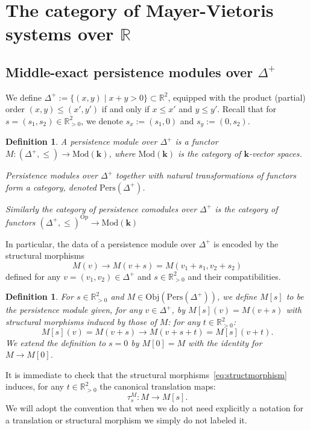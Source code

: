 \documentclass[a4paper, english, 11pt]{article}
\newcommand{\kk}[0]{\textbf{k}}
\newcommand{\Mod}[0]{\text{Mod}}
\newcommand{\0}{\vec{0}}
\newcommand{\R}[0]{\mathbb{R}}
\newcommand{\Obj}[0]{\text{Obj}}
\newcommand{\Op}[0]{\text{Op}}
\newcommand{\Pers}[0]{\text{Pers}}
\newtheorem{defi}[prop]{Definition}
\begin{document}
\section{The category of Mayer-Vietoris systems over $\R$}
\subsection{Middle-exact persistence modules over $\Delta^+$}

We define $\Delta^+ := \{(x,y)\mid x+y > 0\}\subset \R^2$, equipped with the product (partial) order $(x,y)\leq (x',y')$ if and only if $x\leq x'$ and $y\leq y' $. Recall that for $s=(s_1,s_2)\in \R^2_{>0}$, we denote $s_x:=(s_1,0)$ and $s_y := (0,s_2)$. 

\begin{defi}\label{D:PerModule}
A persistence module over $\Delta^+$ is a functor $M : (\Delta^+,\leq) \longrightarrow \Mod(\kk)$, where $\Mod(\kk)$ is the category of $\kk$-vector spaces.

Persistence modules over $\Delta^+$ together with natural transformations of functors form a category, denoted $\Pers(\Delta^+)$.

Similarly the category of persistence comodules over $\Delta^+$ is the category of functors $(\Delta^+,\leq)^{\Op} \longrightarrow \Mod(\kk)$
\end{defi}
In particular, the data of a  persistence module over $\Delta^+$ is encoded by the  structural  morphisms  
\begin{equation}\label{eq:structmorphism}
    M(v) \longrightarrow M(v+s)= M(v_1+s_1, v_2+s_2)
\end{equation}
defined for any $v=(v_1,v_2)\in \Delta^+$ and $s\in \R^2_{>0}$ and their compatibilities. 

\begin{defi} For $s\in \R^2_{>0}$ and $M\in \Obj( \Pers(\Delta^+))$, we define 
$M[s]$ to be the persistence module given, for any $v\in \Delta^+$, by $M[s](v)= M(v+s)$ with structural morphisms induced by those of $M$: for any $t\in \R^2_{>0}$:
$$ M[s](v)=M(v+s) \longrightarrow M(v+s+t)=M[s](v+t).$$
We extend the definition to $s=0$ by $M[0]=M$ with the identity for  $M\to M[0]$.
\end{defi}
It is immediate to check that the structural morphisms~\eqref{eq:structmorphism}
induces, for any $t\in \R^2_{>0}$ the canonical translation maps:
\begin{equation}\label{eq:translmorphism}
   \tau_{s}^M: M \longrightarrow M[s].
\end{equation}
We will adopt the convention that when we do not need explicitly a notation for a translation or structural morphism we simply do not labeled it. 
\end{document}

